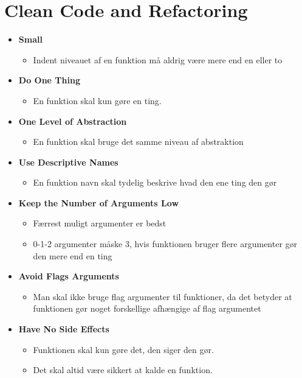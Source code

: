 \documentclass[a4, english]{article}
\begin{document}
\newpage

\section{Clean Code and Refactoring}
\begin{itemize}
	\item \textbf{Small}
  \begin{itemize}
  	\item Indent niveauet af en funktion må aldrig være mere end en eller to
  \end{itemize}
  \item \textbf{Do One Thing}
  \begin{itemize}
  	\item En funktion skal kun gøre en ting.
  \end{itemize}
  \item \textbf{One Level of Abstraction}
  \begin{itemize}
  	\item En funktion skal bruge det samme niveau af abstraktion
  \end{itemize}
  \item \textbf{Use Descriptive Names}
  \begin{itemize}
  	\item En funktion navn skal tydelig beskrive hvad den ene ting den gør
  \end{itemize}
  \item \textbf{Keep the Number of Arguments Low}
  \begin{itemize}
    \item Færrest muligt argumenter er bedst 
    \item 0-1-2 argumenter måske 3, hvis funktionen bruger flere argumenter gør den mere end en ting
  \end{itemize}
  \item \textbf{Avoid Flags Arguments}
  \begin{itemize}
  	\item Man skal ikke bruge flag argumenter til funktioner, da det betyder at funktionen gør noget forskellige afhængige af flag argumentet 
  \end{itemize}
  \item \textbf{Have No Side Effects}
  \begin{itemize}
  	\item Funktionen skal kun gøre det, den siger den gør.
    \item Det skal altid være sikkert at kalde en funktion.

\end{itemize}
\end{itemize}
\end{document}

